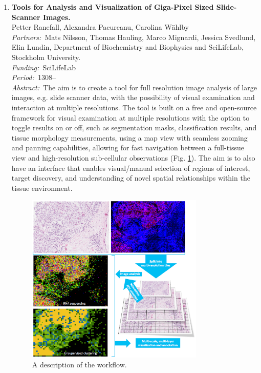 \documentclass[10pt, a4paper]{article}
\newcommand{\aabstract}[1]{\emph{Abstract:~}#1}
\newcommand{\ffunding}[1]{\emph{Funding:~}#1\\}
\newcommand{\ppartners}[1]{\emph{Partners:~}#1\\}
\newcommand{\pperiod}[1]{\emph{Period:~}#1\\}
\begin{document}
\begin{enumerate}
\newpage
\item
\label{proj:gigapixel}
\textbf{Tools for Analysis and Visualization of Giga-Pixel Sized  Slide-Scanner Images.}\\
Petter Ranefall, Alexandra Pacureanu, Carolina W\"{a}hlby\\
\ppartners{Mats Nilsson, Thomas Hauling, Marco Mignardi, Jessica Svedlund, Elin Lundin, Department of Biochemistry and Biophysics and SciLifeLab, Stockholm University.}
\ffunding{SciLifeLab}
\pperiod{1308--}
\aabstract{The aim is to create a tool for full resolution image analysis of large images, e.g. slide scanner data, with the possibility of visual examination and interaction at multiple resolutions. The tool is built on a free and open-source framework for visual examination at multiple resolutions with the option to toggle results on or off, such as segmentation masks, classification results, and tissue morphology measurements, using a map view with seamless zooming and panning capabilities, allowing for fast navigation between a full-tissue view and high-resolution sub-cellular observations (Fig. \ref{fig:gigapixel}). The aim is to also have an interface that enables visual/manual selection of regions of interest, target discovery, and understanding of novel spatial relationships within the tissue environment.}

\begin{figure}[!htbp]
\centering
\includegraphics[width=0.8\textwidth]{figures/research/gigapixel.png}
\caption{\label{fig:gigapixel} A description of the workflow.} 
\end{figure}



\end{enumerate}
\end{document}
